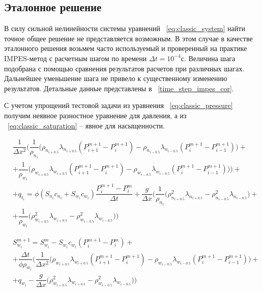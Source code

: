 \subsection{Эталонное решение}
\label{reference sample}
В силу сильной нелинейности системы уравнений ~\ref{eq:classic_system} найти точное общее решение не представляется возможным.
В этом случае в качестве эталонного решения возьмем часто используемый и проверенный на практике IMPES-метод с расчетным шагом по
времени $\Delta t = 10^{-4}\text{с}$. Величина шага подобрана с помощью сравнения результатов расчетов при различных шагах.
Дальнейшее уменьшение шага не привело к существенному изменению результатов. Детальные данные представлены в ~\ref{time_step_impes_cor}.

С учетом упрощений тестовой задачи из уравнения ~\ref{eq:classic_pressure} получим неявное разностное уравнение для давления,
а из ~\ref{eq:classic_saturation} -- явное для насыщенности.

\begin{equation} \label{eq:scheme_p}
 \begin{aligned} 
  & \dfrac{1}{\Delta x^2} \bigg(\dfrac{1}{\rho_{n_i}} \big( \rho_{n_{i+0.5}} \lambda_{n_{i+0.5}} (P_{i+1}^{m+1} - P_i^{m+1})
  - \rho_{n_{i-0.5}} \lambda_{n_{i-0.5}} (P_i^{m+1} - P_{i-1}^{m+1})\big) + \\
  &+ \dfrac{1}{\rho_{w_i}} \big( \rho_{w_{i+0.5}} \lambda_{w_{i+0.5}} (P_{i+1}^{m+1} - P_i^{m+1})
  - \rho_{w_{i-0.5}} \lambda_{w_{i-0.5}} (P_i^{m+1} - P_{i-1}^{m+1})\big)\bigg) + \\
  & + q_{t_i} = \phi(S_{n_i}c_{n_i}+S_{w_i}c_{w_i}) \dfrac{P_i^{m+1} - P_i^m}{\Delta t}
  + \dfrac{g}{\Delta x} \bigg(\dfrac{1}{\rho_{n_i}} \big( \rho_{n_{i+0.5}}^2 \lambda_{n_{i+0.5}} 
  - \rho_{n_{i-0.5}}^2 \lambda_{n_{i-0.5}} \big) + \\
  &+ \dfrac{1}{\rho_{w_i}} \big( \rho_{w_{i+0.5}}^2 \lambda_{w_{i+0.5}} 
  - \rho_{w_{i-0.5}}^2 \lambda_{w_{i-0.5}} \big)\bigg)
 \end{aligned}
\end{equation}

\begin{equation} \label{eq:scheme_s}
 \begin{aligned} 
  & S_{w_i}^{m+1} = S_{w_i}^{m} - S_{w_i}c_{w_i} (P_i^{m+1} - P_i^m) + \\
  & + \dfrac{\Delta t}{\phi\rho_{w_i}}\Bigg( \dfrac{1}{\Delta x^2} \bigg(\rho_{w_{i+0.5}} \lambda_{w_{i+0.5}} (P_{i+1}^{m+1} - P_i^{m+1})
  - \rho_{w_{i-0.5}} \lambda_{w_{i-0.5}} (P_i^{m+1} - P_{i-1}^{m+1}) \bigg) +\\
  & + q_{w_i} - \dfrac{g}{\Delta x} \bigg(\rho_{w_{i+0.5}}^2 \lambda_{w_{i+0.5}} - \rho_{w_{i-0.5}}^2 \lambda_{w_{i-0.5}} \bigg) \Bigg)
 \end{aligned}
\end{equation}

